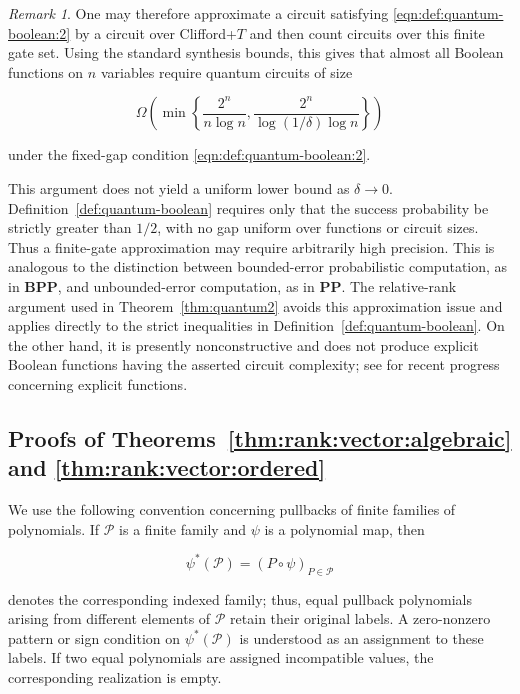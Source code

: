 \documentclass[10pt]{amsart}
\theoremstyle{definition}
\theoremstyle{remark}
\newtheorem{remark}{Remark}
\numberwithin{equation}{section}
\begin{document}
\begin{remark}
One may therefore approximate a circuit satisfying  \eqref{eqn:def:quantum-boolean:2} by a circuit over Clifford+\(T\) and then count circuits over this finite gate set. Using the standard synthesis bounds, this gives that almost all Boolean functions on \(n\) variables require quantum circuits of size

$$
\Omega\!\left(
\min\left\{
\frac{2^n}{n\log n},
\frac{2^n}{\log(1/\delta)\log n}
\right\}
\right)
$$

under the fixed-gap condition \eqref{eqn:def:quantum-boolean:2}.

This argument does not yield a uniform lower bound as \(\delta\to0\). Definition~\ref{def:quantum-boolean} requires only that the success probability be strictly greater than \(1/2\), with no gap uniform over functions or circuit sizes. Thus a finite-gate approximation may require arbitrarily high precision. This is analogous to the distinction between bounded-error probabilistic computation, as in \(\mathbf{BPP}\), and unbounded-error computation, as in \(\mathbf{PP}\). The relative-rank argument used in Theorem~\ref{thm:quantum2} avoids this approximation issue and applies directly to the strict inequalities in Definition~\ref{def:quantum-boolean}. On the other hand, it is presently nonconstructive and does not produce explicit Boolean functions having the asserted circuit complexity; see \cite{Yifan-et-al} for recent progress concerning explicit functions.
\end{remark}





\subsection{Proofs of Theorems~\ref{thm:rank:vector:algebraic} and \ref{thm:rank:vector:ordered}}
We use the following convention concerning pullbacks of finite families of polynomials. If \(\mathcal P\) is a finite family and \(\psi\) is a polynomial map, then

$$
\psi^*(\mathcal P)=(P\circ\psi)_{P\in\mathcal P}
$$

denotes the corresponding indexed family; thus, equal pullback polynomials arising from different elements of \(\mathcal P\) retain their original labels. A zero-nonzero pattern or sign condition on \(\psi^*(\mathcal P)\) is understood as an assignment to these labels. If two equal polynomials are assigned incompatible values, the corresponding realization is empty.
\end{document}
